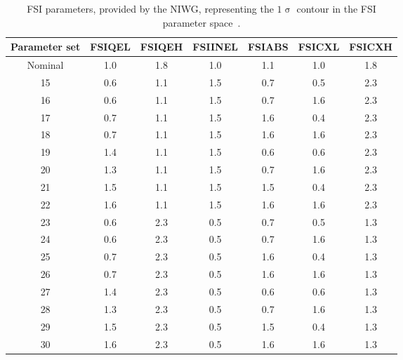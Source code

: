 \begin{table}
  \begin{tabular}{ c c c c c c c }
    Parameter set & FSIQEL & FSIQEH & FSIINEL & FSIABS & FSICXL & FSICXH \\ \hline \hline
    Nominal & 1.0 & 1.8 & 1.0 & 1.1 & 1.0 & 1.8 \\
    15 & 0.6 & 1.1 & 1.5 & 0.7 & 0.5 & 2.3 \\
    16 & 0.6 & 1.1 & 1.5 & 0.7 & 1.6 & 2.3 \\
    17 & 0.7 & 1.1 & 1.5 & 1.6 & 0.4 & 2.3 \\
    18 & 0.7 & 1.1 & 1.5 & 1.6 & 1.6 & 2.3 \\
    19 & 1.4 & 1.1 & 1.5 & 0.6 & 0.6 & 2.3 \\
    20 & 1.3 & 1.1 & 1.5 & 0.7 & 1.6 & 2.3 \\
    21 & 1.5 & 1.1 & 1.5 & 1.5 & 0.4 & 2.3 \\
    22 & 1.6 & 1.1 & 1.5 & 1.6 & 1.6 & 2.3 \\
    23 & 0.6 & 2.3 & 0.5 & 0.7 & 0.5 & 1.3 \\
    24 & 0.6 & 2.3 & 0.5 & 0.7 & 1.6 & 1.3 \\
    25 & 0.7 & 2.3 & 0.5 & 1.6 & 0.4 & 1.3 \\
    26 & 0.7 & 2.3 & 0.5 & 1.6 & 1.6 & 1.3 \\
    27 & 1.4 & 2.3 & 0.5 & 0.6 & 0.6 & 1.3 \\
    28 & 1.3 & 2.3 & 0.5 & 0.7 & 1.6 & 1.3 \\
    29 & 1.5 & 2.3 & 0.5 & 1.5 & 0.4 & 1.3 \\
    30 & 1.6 & 2.3 & 0.5 & 1.6 & 1.6 & 1.3 \\
  \end{tabular}
  \caption{FSI parameters, provided by the NIWG, representing the $1\upsigma$ contour in the FSI parameter space~\cite{NIWGErrorTN}.}
  \label{table:FSIErrors}
\end{table}
